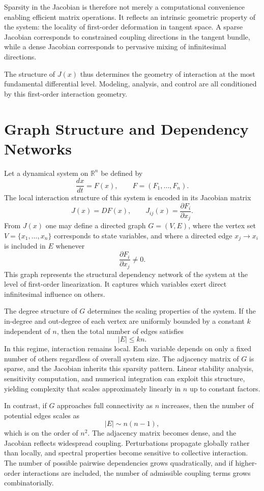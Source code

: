 \documentclass[12pt]{book}
\begin{document}
Sparsity in the Jacobian is therefore not merely a computational convenience enabling efficient matrix operations. It reflects an intrinsic geometric property of the system: the locality of first-order deformation in tangent space. A sparse Jacobian corresponds to constrained coupling directions in the tangent bundle, while a dense Jacobian corresponds to pervasive mixing of infinitesimal directions.

The structure of $J(x)$ thus determines the geometry of interaction at the most fundamental differential level. Modeling, analysis, and control are all conditioned by this first-order interaction geometry.

\section{Graph Structure and Dependency Networks}

Let a dynamical system on $\mathbb{R}^n$ be defined by
\[
\frac{dx}{dt} = F(x),
\qquad
F = (F_1,\dots,F_n).
\]
The local interaction structure of this system is encoded in its Jacobian matrix
\[
J(x) = D F(x),
\qquad
J_{ij}(x) = \frac{\partial F_i}{\partial x_j}.
\]
From $J(x)$ one may define a directed graph $G = (V,E)$, where the vertex set $V = \{x_1,\dots,x_n\}$ corresponds to state variables, and where a directed edge $x_j \to x_i$ is included in $E$ whenever
\[
\frac{\partial F_i}{\partial x_j} \neq 0.
\]
This graph represents the structural dependency network of the system at the level of first-order linearization. It captures which variables exert direct infinitesimal influence on others.

The degree structure of $G$ determines the scaling properties of the system. If the in-degree and out-degree of each vertex are uniformly bounded by a constant $k$ independent of $n$, then the total number of edges satisfies
\[
|E| \le k n.
\]
In this regime, interaction remains local. Each variable depends on only a fixed number of others regardless of overall system size. The adjacency matrix of $G$ is sparse, and the Jacobian inherits this sparsity pattern. Linear stability analysis, sensitivity computation, and numerical integration can exploit this structure, yielding complexity that scales approximately linearly in $n$ up to constant factors.

In contrast, if $G$ approaches full connectivity as $n$ increases, then the number of potential edges scales as
\[
|E| \sim n(n-1),
\]
which is on the order of $n^2$. The adjacency matrix becomes dense, and the Jacobian reflects widespread coupling. Perturbations propagate globally rather than locally, and spectral properties become sensitive to collective interaction. The number of possible pairwise dependencies grows quadratically, and if higher-order interactions are included, the number of admissible coupling terms grows combinatorially.
\end{document}
